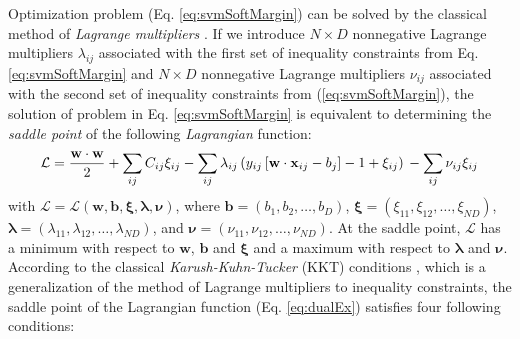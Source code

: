 Optimization problem (Eq. \ref{eq:svmSoftMargin}) can be solved by the classical method of {\em Lagrange multipliers} \cite{Boyd2004,Cortes1995}. 
If we introduce $N\times D$ nonnegative Lagrange multipliers $\lambda_{ij}$ associated with the first set of inequality constraints  from Eq. \ref{eq:svmSoftMargin} 
and $N\times D$ nonnegative Lagrange multipliers $\nu_{ij}$ associated with the second set of inequality constraints  from (\ref{eq:svmSoftMargin}), the solution of 
problem in Eq. \ref{eq:svmSoftMargin} is equivalent to determining the {\em saddle point} of the following {\em Lagrangian} function:
\begin{equation}
\mathcal{L} = \frac{\mathbf{w}\cdot\mathbf{w}}{2} + \sum_{ij}C_{ij}\xi_{ij} - \sum_{ij}\lambda_{ij} \left(y_{ij} \left[ \mathbf{w}\cdot\mathbf{x}_{ij}-b_j \right]-1 +\xi_{ij} \right)\\
- \sum_{ij}\nu_{ij} \xi_{ij}
\label{eq:dualEx}
\end{equation}
with $\mathcal{L} = \mathcal{L}(\mathbf{w},\mathbf{b},{\boldsymbol \xi},{\boldsymbol \lambda},\boldsymbol{\nu})$, where
$\mathbf{b}=(b_1,b_2,\ldots, b_D)$,
$\boldsymbol{\xi}=(\xi_{11},\xi_{12},\ldots, \xi_{ND})$,
$\boldsymbol{\lambda}=(\lambda_{11},\lambda_{12},\ldots, \lambda_{ND})$, and
$\boldsymbol{\nu}=(\nu_{11},\nu_{12},\ldots, \nu_{ND})$. At the saddle point, $\mathcal{L}$ has a minimum with respect to $\mathbf{w}$, $\mathbf{b}$ 
and $\boldsymbol{\xi}$ and a maximum  with respect to $\boldsymbol{\lambda}$ and $\boldsymbol{\nu}$.
According to the classical {\em  Karush-Kuhn-Tucker} (KKT) conditions \cite{Kuhn1951,Boyd2004}, 
which is a generalization of the method of Lagrange multipliers to inequality constraints,
the saddle point of the Lagrangian function (Eq. \ref{eq:dualEx}) satisfies four following conditions:
